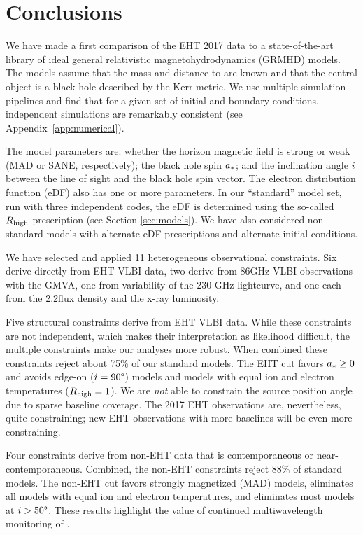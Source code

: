 \section{Conclusions}
\label{sec:conclusions}

We have made a first comparison of the EHT 2017 \sgra data to a state-of-the-art library of ideal general relativistic magnetohydrodynamics (GRMHD) models.  The models assume that the mass and distance to \sgra are known and that the central object is a black hole described by the Kerr metric.  We use multiple simulation pipelines and find that for a given set of initial and boundary conditions, independent simulations are remarkably consistent (see Appendix~\ref{app:numerical}).

The model parameters are: whether the horizon magnetic field is strong or weak (MAD or SANE, respectively); the black hole spin $a_*$; and the inclination angle $i$ between the line of sight and the black hole spin vector.  The electron distribution function (eDF) also has one or more parameters.  In our ``standard'' model set, run with three independent codes, the eDF is determined using the so-called $R_\mathrm{high}$ prescription (see Section \ref{sec:models}).  We have also considered non-standard models with alternate eDF prescriptions and alternate initial conditions.

We have selected and applied 11 heterogeneous observational constraints.  Six derive directly from EHT VLBI data, two derive from 86GHz VLBI observations with the GMVA, one from variability of the 230 GHz lightcurve, and one each from the 2.2\um flux density and the x-ray luminosity.

Five structural constraints derive from EHT VLBI data.
While these constraints are not independent, which makes their interpretation as likelihood difficult, the multiple constraints make our analyses more robust.
When combined these constraints reject about 75\% of our standard models.  The EHT cut favors $a_* \ge 0$ and avoids edge-on ($i = 90\degree$) models and models with equal ion and electron temperatures ($R_\mathrm{high} = 1$).
We are {\em not} able to constrain the source position angle due to sparse baseline coverage.
The 2017 EHT observations are, nevertheless, quite constraining; new EHT observations with more baselines will be even more constraining.

Four constraints derive from non-EHT data that is contemporaneous or near-contemporaneous.  Combined, the non-EHT constraints reject 88\% of standard models.  The non-EHT cut favors strongly magnetized (MAD) models, eliminates all models with equal ion and electron temperatures, and eliminates most models at $i > 50\degree$.  These results highlight the value of continued multiwavelength monitoring of \sgra.

